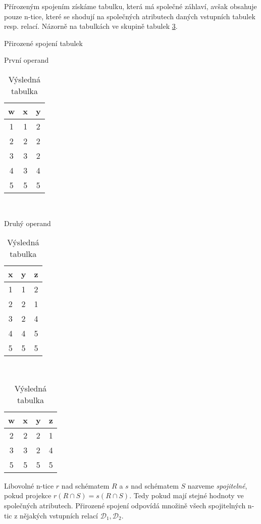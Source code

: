 \begin{upexample}
Přírozeným spojením získáme tabulku, která má společné záhlaví, avšak obsahuje pouze n-tice, které se shodují na společných atributech daných vstupních tabulek resp. relací. Názorně na tabulkách ve skupině tabulek \ref{tab:prir_spojeni}.
\begin{table}
\caption{Přirozené spojení tabulek}\label{tab:prir_spojeni}
\begin{subtable}[t]{0.3\textwidth}
\centering
\caption{První operand}
\begin{tabular}{c | c | c}
w & x & y \\
\hline
1 & 1 & 2 \\
2 & \cellcolor{red}2 & \cellcolor{red}2 \\
3 & \cellcolor{yellow}3 & \cellcolor{yellow}2 \\
4 & 3 & 4 \\
5 & \cellcolor{green}5 & \cellcolor{green}5
\end{tabular}
\end{subtable}
~
\begin{subtable}[t]{0.3\textwidth}
\centering
\caption{Druhý operand}
\begin{tabular}{c | c | c}
x & y & z \\
\hline
1 & 1 & 2 \\
\cellcolor{red}2 & \cellcolor{red}2 & 1 \\
\cellcolor{yellow}3 & \cellcolor{yellow}2 & 4 \\
4 & 4 & 5 \\
\cellcolor{green}5 & \cellcolor{green}5 & 5
\end{tabular}
\end{subtable}
~
\begin{subtable}[t]{0.3\textwidth}
\centering
\caption{Výsledná tabulka}
\begin{tabular}{c | c | c | c}
w & x & y & z \\
\hline
2 & \cellcolor{red}2 & \cellcolor{red}2 & 1 \\
3 & \cellcolor{yellow}3 & \cellcolor{yellow}2 & 4 \\
5 & \cellcolor{green}5 & \cellcolor{green}5 & 5
\end{tabular}
\end{subtable}
\end{table}
\end{upexample}
Libovolné n-tice $r$ nad schématem $R$ a $s$ nad schématem $S$ nazveme \textit{spojitelné}, pokud projekce $r (R \cap S) = s (R \cap S)$. Tedy pokud mají stejné hodnoty ve společných atributech. Přirozené spojení odpovídá množině všech spojitelných n-tic z nějakých vstupních relací $\mathcal{D}_{1}, \mathcal{D}_{2}$.
